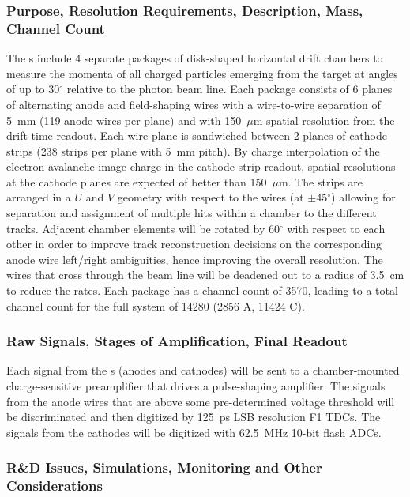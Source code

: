 \subsubsection*{Purpose, Resolution Requirements, Description, Mass, Channel Count}

The \fdc{}s include 4 separate packages of disk-shaped horizontal drift chambers 
to measure the momenta of all charged particles emerging from the target at 
angles of up to 30$^{\circ}$ relative to the photon beam line.  Each package
consists of 6 planes of alternating anode and field-shaping wires with a 
wire-to-wire separation of 5~mm (119 anode wires per plane) and with 150~$\mu$m 
spatial resolution from the drift time readout.  Each wire plane is sandwiched 
between 2 planes of cathode strips (238 strips per plane with 5~mm pitch).  By 
charge interpolation of the electron avalanche image charge in the cathode strip 
readout, spatial resolutions at the cathode planes are expected of better than 
150~$\mu$m.  The strips are arranged in a $U$ and $V$ geometry with respect to 
the wires (at $\pm$45$^{\circ}$) allowing for separation and assignment of 
multiple hits within a chamber to the different tracks.  Adjacent chamber 
elements will be rotated by 60$^{\circ}$ with respect to each other in order 
to improve track reconstruction decisions on the corresponding anode wire 
left/right ambiguities, hence improving the overall resolution.  The wires 
that cross through the beam line will be deadened out to a radius of 3.5~cm 
to reduce the rates.  Each \fdc{} package has a channel count of 3570, leading 
to a total channel count for the full \fdc{} system of 14280 (2856 A, 11424 C).

\subsubsection*{Raw Signals, Stages of Amplification, Final Readout}

Each signal from the \fdc{}s (anodes and cathodes) will be sent to a
chamber-mounted charge-sensitive preamplifier that drives a pulse-shaping 
amplifier. The signals from the anode wires that are above some 
pre-determined voltage threshold will be discriminated and then digitized 
by 125~ps LSB resolution F1 TDCs.  The signals from the cathodes will be digitized with 
62.5~MHz 10-bit flash ADCs.

\subsubsection*{R\&D Issues, Simulations, Monitoring and Other Considerations}

